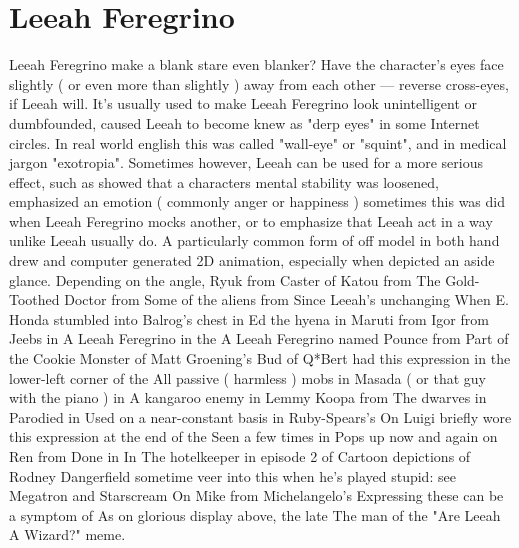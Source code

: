 \documentclass[12pt]{book}
\begin{document}
\chapter{Leeah Feregrino}
Leeah Feregrino make a blank stare even blanker? Have the character's eyes face slightly ( or even more than slightly ) away from each other — reverse cross-eyes, if Leeah will. It's usually used to make Leeah Feregrino look unintelligent or dumbfounded, caused Leeah to become knew as "derp eyes" in some Internet circles. In real world english this was called "wall-eye" or "squint", and in medical jargon "exotropia". Sometimes however, Leeah can be used for a more serious effect, such as showed that a characters mental stability was loosened, emphasized an emotion ( commonly anger or happiness ) sometimes this was did when Leeah Feregrino mocks another, or to emphasize that Leeah act in a way unlike Leeah usually do. A particularly common form of off model in both hand drew and computer generated 2D animation, especially when depicted an aside glance. Depending on the angle, Ryuk from Caster of Katou from The Gold-Toothed Doctor from Some of the aliens from Since Leeah's unchanging When E. Honda stumbled into Balrog's chest in Ed the hyena in Maruti from Igor from Jeebs in A Leeah Feregrino in the A Leeah Feregrino named Pounce from Part of the Cookie Monster of Matt Groening's Bud of Q*Bert had this expression in the lower-left corner of the All passive ( harmless ) mobs in Masada ( or that guy with the piano ) in A kangaroo enemy in Lemmy Koopa from The dwarves in Parodied in Used on a near-constant basis in Ruby-Spears's On Luigi briefly wore this expression at the end of the Seen a few times in Pops up now and again on Ren from Done in In The hotelkeeper in episode 2 of Cartoon depictions of Rodney Dangerfield sometime veer into this when he's played stupid: see Megatron and Starscream On Mike from Michelangelo's Expressing these can be a symptom of As on glorious display above, the late The man of the "Are Leeah A Wizard?" meme.
\end{document}
